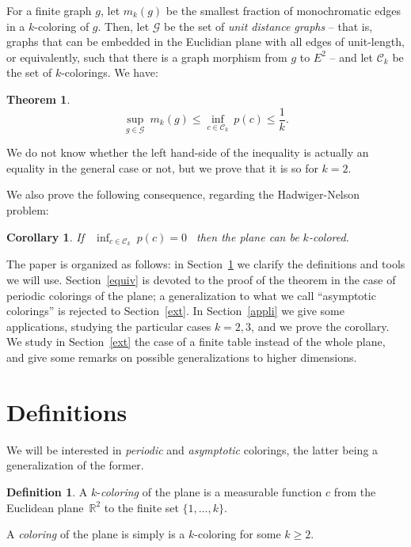 \documentclass[a4paper,11pt]{article}
\newtheorem{cons}{Corollary}
\newtheorem*{theo*}{Theorem}
\theoremstyle{definition}
\newtheorem{definition}{Definition}
\theoremstyle{remark}
\newcommand{\R}{\mathbb{R}}
\newcommand{\C}{\mathcal{C}}
\newcommand{\Ca}{\mathcal{C}}
\begin{document}
For a finite graph $g$, let $m_k(g)$ be the smallest fraction of monochromatic
edges in a $k$-coloring of $g$. Then, let $\mathcal{G}$ be the set of 
\textit{unit distance graphs} -- that is, graphs that can be embedded in the
Euclidian plane with all edges of unit-length, or equivalently, such that there is
a graph morphism from $g$ to $E^2$ -- and let $\C_k$ be the set of $k$-colorings. We
have:
\begin{theo*}
$$ \sup_{g \in \mathcal{G}} \ m_k(g) \leq \inf_{c \in \C_k} \ p(c) \leq \frac{1}{k}. $$
\end{theo*}
We do not know whether the left hand-side of the inequality is actually an equality in
the general case or not, but we prove that it is so for $k=2$.

We also prove the following consequence, regarding the Hadwiger-Nelson problem:
\begin{cons} \label{con}
If \ $\inf_{c \in \Ca_k} \ p(c) = 0$ \ then the plane can be $k$-colored.
\end{cons}

The paper is organized as follows: in Section~\ref{defsection} we clarify the
definitions and tools we will use. Section~\ref{equiv} is devoted to the proof 
of the theorem in the case of periodic colorings of the plane; a generalization
to what we call ``asymptotic colorings'' is rejected to Section~\ref{ext}.
In Section~\ref{appli} we give some applications, studying the particular cases $k=2,3$,
and we prove the corollary.
We study in Section~\ref{ext} the case of a finite table instead of the whole plane, 
and give some remarks on possible 
generalizations to higher dimensions.

\section{Definitions} \label{defsection}
We will be interested in \textit{periodic} and \textit{asymptotic} colorings,
the latter being a generalization of the former.
\begin{definition}
A $k$-\textit{coloring} of the plane is a measurable function $c$ from the Euclidean 
plane~$\R ^2$ to the finite set $\{1, \dots , k \}$.

A \textit{coloring} of the plane is simply is a $k$-coloring for some $k \geq 2$.
\end{definition}
\end{document}
